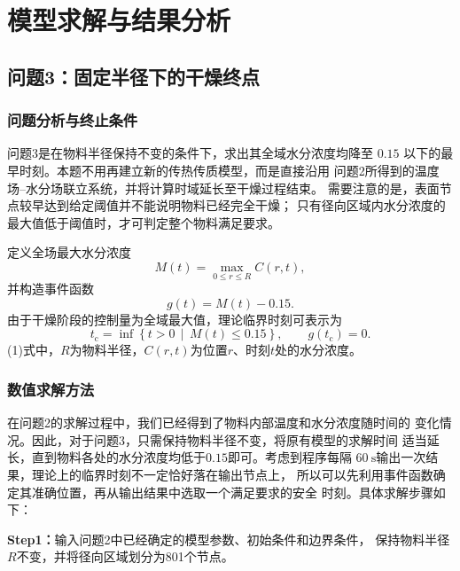 \documentclass[UTF8,a4paper,12pt]{ctexart}
\begin{document}
\section{模型求解与结果分析}

\subsection{问题3：固定半径下的干燥终点}

\subsubsection{问题分析与终止条件}

问题3是在物料半径保持不变的条件下，求出其全域水分浓度均降至
$0.15$ 以下的最早时刻。本题不用再建立新的传热传质模型，而是直接沿用
问题2所得到的温度场--水分场联立系统，并将计算时域延长至干燥过程结束。
需要注意的是，表面节点较早达到给定阈值并不能说明物料已经完全干燥；
只有径向区域内水分浓度的最大值低于阈值时，才可判定整个物料满足要求。

定义全场最大水分浓度
\begin{equation}
M(t)=\max_{0\leq r\leq R}C(r,t),
\label{eq:q3_max_concentration}
\end{equation}
并构造事件函数
\begin{equation}
g(t)=M(t)-0.15.
\label{eq:q3_event}
\end{equation}
由于干燥阶段的控制量为全域最大值，理论临界时刻可表示为
\begin{equation}
t_{\mathrm{c}}
=\inf\left\{t>0\,\middle|\,M(t)\leq 0.15\right\},
\qquad g\!\left(t_{\mathrm{c}}\right)=0.
\label{eq:q3_continuous_time}
\end{equation}
(1)式中，$R$为物料半径，$C(r,t)$为位置$r$、时刻$t$处的水分浓度。

\subsubsection{数值求解方法}

在问题2的求解过程中，我们已经得到了物料内部温度和水分浓度随时间的
变化情况。因此，对于问题3，只需保持物料半径不变，将原有模型的求解时间
适当延长，直到物料各处的水分浓度均低于$0.15$即可。考虑到程序每隔
$60\ \mathrm{s}$输出一次结果，理论上的临界时刻不一定恰好落在输出节点上，
所以可以先利用事件函数确定其准确位置，再从输出结果中选取一个满足要求的安全
时刻。具体求解步骤如下：

\noindent\textbf{Step1：}输入问题2中已经确定的模型参数、初始条件和边界条件，
保持物料半径$R$不变，并将径向区域划分为801个节点。
\end{document}
